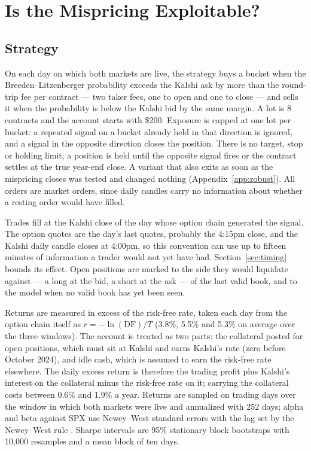 \documentclass{article}
\begin{document}
\section{Is the Mispricing Exploitable?}\label{sec:strategy}

\subsection{Strategy}
On each day on which both markets are live, the strategy buys a bucket when the Breeden--Litzenberger probability exceeds the Kalshi ask by more than the round-trip fee per contract --- two taker fees, one to open and one to close --- and sells it when the probability is below the Kalshi bid by the same margin. A lot is 8 contracts and the account starts with \$200. Exposure is capped at one lot per bucket: a repeated signal on a bucket already held in that direction is ignored, and a signal in the opposite direction closes the position. There is no target, stop or holding limit; a position is held until the opposite signal fires or the contract settles at the true year-end close. A variant that also exits as soon as the mispricing closes was tested and changed nothing (Appendix~\ref{app:robust}). All orders are market orders, since daily candles carry no information about whether a resting order would have filled.

Trades fill at the Kalshi close of the day whose option chain generated the signal. The option quotes are the day's last quotes, probably the 4:15pm close, and the Kalshi daily candle closes at 4:00pm, so this convention can use up to fifteen minutes of information a trader would not yet have had. Section~\ref{sec:timing} bounds its effect. Open positions are marked to the side they would liquidate against --- a long at the bid, a short at the ask --- of the last valid book, and to the model when no valid book has yet been seen.

Returns are measured in excess of the risk-free rate, taken each day from the option chain itself as $r = -\ln(\mathrm{DF})/T$ (3.8\%, 5.5\% and 5.3\% on average over the three windows). The account is treated as two parts: the collateral posted for open positions, which must sit at Kalshi and earns Kalshi's rate (zero before October 2024), and idle cash, which is assumed to earn the risk-free rate elsewhere. The daily excess return is therefore the trading profit plus Kalshi's interest on the collateral minus the risk-free rate on it; carrying the collateral costs between 0.6\% and 1.9\% a year. Returns are sampled on trading days over the window in which both markets were live and annualized with 252 days; alpha and beta against SPX use Newey--West standard errors \cite{NeweyWest1987} with the lag set by the Newey--West rule \cite{NeweyWest1994}. Sharpe intervals are 95\% stationary block bootstraps \cite{Politis1994} with 10{,}000 resamples and a mean block of ten days.
\end{document}
